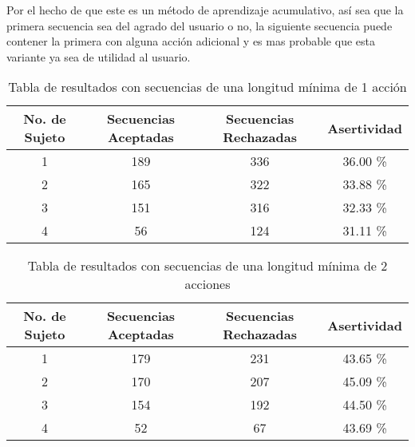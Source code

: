 Por el hecho de que este es un m\'etodo de aprendizaje acumulativo, as\'i sea que la primera secuencia sea del agrado del usuario o no, la siguiente secuencia puede contener la primera con alguna acci\'on adicional y es mas probable que esta variante ya sea de utilidad al usuario. 


\begin{table}[]
\centering
\begin{tabular}{cccc}
\hline
		No. de Sujeto	&	Secuencias Aceptadas	&   Secuencias Rechazadas	&	Asertividad		\\ \hline
		1				&	189						&	336						&	36.00 \%		\\
		2				&	165						&	322						&	33.88 \%		\\
		3				&	151						&	316						&	32.33 \%		\\
		4				&	56						&	124						&	31.11 \%		\\
\hline
\end{tabular}
\caption{Tabla de resultados con secuencias de una longitud m\'inima de 1 acci\'on}
\label{tableRes1}
\end{table}



\begin{table}[]
\centering
\begin{tabular}{cccc}
\hline
		No. de Sujeto	&	Secuencias Aceptadas	&   Secuencias Rechazadas	&	Asertividad		\\ \hline
		1				&	179						&	231						&	43.65 \%		\\
		2				&	170						&	207						&	45.09 \%		\\
		3				&	154						&	192						&	44.50 \%		\\
		4				&	52						&	67						&	43.69 \%		\\
\hline
\end{tabular}
\caption{Tabla de resultados con secuencias de una longitud m\'inima de 2 acciones}
\label{tableRes2}
\end{table}


